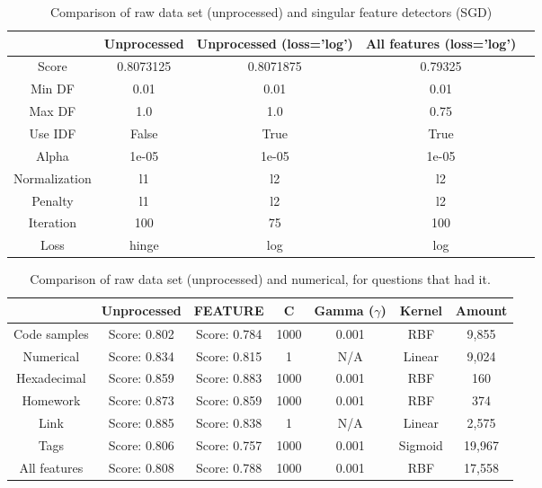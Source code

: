 \begin{table}[!h]%
	\centering
	\begin{tabular}{| c| c | c | c | c |}
		\hline
		~				& Unprocessed		& Unprocessed (loss='log')		& All features (loss='log')	\\ \hline
		Score 			& 0.8073125				& 0.8071875					& 0.79325					\\ \hline
		Min DF 			& 0.01					& 0.01						& 0.01						\\ \hline
		Max DF 			& 1.0					& 1.0						& 0.75						\\ \hline
		Use IDF			& False					& True						& True						\\ \hline
		Alpha 			& 1e-05					& 1e-05						& 1e-05						\\ \hline
		Normalization 	& l1					& l2						& l2						\\ \hline		
		Penalty 		& l1					& l2						& l2						\\ \hline
		Iteration 		& 100					& 75						& 100						\\ \hline
		Loss 			& hinge					& log						& log						\\ \hline		
	\end{tabular}
	\caption{Comparison of raw data set (unprocessed) and singular feature detectors (SGD)}
	\label{tab:unprocessed_vs_all_feature_detectors_sgd_so}
\end{table}


\begin{table}[!h]%
	\centering
	\begin{tabular}{| c | c | c | c | c | c | c |}
		\hline
		~				& Unprocessed		& FEATURE		& C			& Gamma ($\gamma$)	& Kernel	& Amount	 	\\ \hline
		Code samples 	& Score: 0.802		& Score: 0.784	& 1000		& 0.001				& RBF 		& 9,855 		\\ \hline
		Numerical		& Score: 0.834		& Score: 0.815	& 1			& N/A				& Linear	& 9,024			\\ \hline
		Hexadecimal		& Score: 0.859		& Score: 0.883	& 1000		& 0.001				& RBF		& 160 			\\ \hline
		Homework 		& Score: 0.873		& Score: 0.859	& 1000		& 0.001				& RBF		& 374 			\\ \hline
		Link			& Score: 0.885		& Score: 0.838	& 1			& N/A				& Linear	& 2,575			\\ \hline
		Tags			& Score: 0.806		& Score: 0.757	& 1000		& 0.001				& Sigmoid	& 19,967		\\ \hline
		All features	& Score: 0.808		& Score: 0.788	& 1000		& 0.001				& RBF 		& 17,558		\\ \hline
	\end{tabular}
	\caption{Comparison of raw data set (unprocessed) and numerical, for questions that had it.}
	\label{tab:comparison_of_feature_occurences_only}
\end{table}


